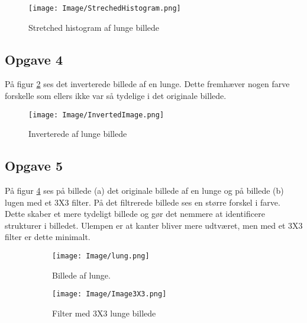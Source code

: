 \documentclass{article}
\begin{document}
\begin{figure}[H] 
     \begin{center} 
        \texttt{[image: Image/StrechedHistogram.png]} 
        \caption{Stretched histogram af lunge billede} 
    \end{center} 
    \label{fig:f3} 
\end{figure} 

\subsection{Opgave 4} 

På figur \ref{fig:f4} ses det inverterede billede af en lunge. Dette fremhæver nogen farve forskelle som ellers ikke var så tydelige i det originale billede.  

\begin{figure}[H]  
  \begin{center} 
    \texttt{[image: Image/InvertedImage.png]} 
  \end{center} 
  \caption{Inverterede af lunge billede} 
  \label{fig:f4} 
\end{figure} 

\subsection{Opgave 5} 

På figur \ref{fig:image2} ses på billede (a) det originale billede af en lunge og på billede (b) lugen med et 3X3 filter. På det filtrerede billede ses en større forskel i farve. Dette skaber et mere tydeligt billede og gør det nemmere at identificere strukturer i billedet.\newline 
Ulempen er at kanter bliver mere udtværet, men med et 3X3 filter er dette minimalt.  

\begin{figure}[H] 
  \begin{subfigure}[b]{0.49\textwidth} 
    \texttt{[image: Image/lung.png]} 
    \caption{Billede af lunge.} 
  \end{subfigure} 
  \hfill 
  \begin{subfigure}[b]{0.49\textwidth} 
    \texttt{[image: Image/Image3X3.png]} 
    \caption{Filter med 3X3 lunge billede} 
    \label{fig:f5} 
  \end{subfigure} 
    \caption{} 
    \label{fig:image2} 
\end{figure} 
\end{document}
